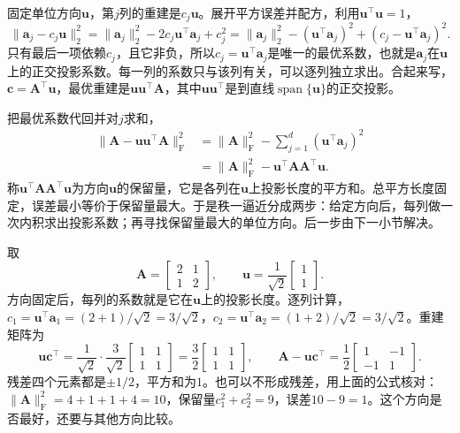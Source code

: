 固定单位方向$\bm u$，第$j$列的重建是$c_j\bm u$。展开平方误差并配方，利用$\bm u^\top\bm u=1$，
\[
 \lVert\bm a_j-c_j\bm u\rVert_2^2
 =\lVert\bm a_j\rVert_2^2-2c_j\bm u^\top\bm a_j+c_j^2
 =\lVert\bm a_j\rVert_2^2-(\bm u^\top\bm a_j)^2+(c_j-\bm u^\top\bm a_j)^2 .
\]
只有最后一项依赖$c_j$，且它非负，所以$c_j=\bm u^\top\bm a_j$是唯一的最优系数，也就是$\bm a_j$在$\bm u$上的正交投影系数。每一列的系数只与该列有关，可以逐列独立求出。合起来写，$\bm c=\bm A^\top\bm u$，最优重建是$\bm u\bm u^\top\bm A$，其中$\bm u\bm u^\top$是到直线$\operatorname{span}\{\bm u\}$的正交投影。

把最优系数代回并对$j$求和，
\[
 \begin{aligned}
 \lVert\bm A-\bm u\bm u^\top\bm A\rVert_{\mathrm F}^2
 &=\lVert\bm A\rVert_{\mathrm F}^2-\sum_{j=1}^d(\bm u^\top\bm a_j)^2\\
 &=\lVert\bm A\rVert_{\mathrm F}^2-\bm u^\top\bm A\bm A^\top\bm u .
 \end{aligned}
\]
称$\bm u^\top\bm A\bm A^\top\bm u$为方向$\bm u$的保留量，它是各列在$\bm u$上投影长度的平方和。总平方长度固定，误差最小等价于保留量最大。于是秩一逼近分成两步：给定方向后，每列做一次内积求出投影系数；再寻找保留量最大的单位方向。后一步由下一小节解决。

\begin{example}[固定方向时的秩一重建]
\label{ex:matrix-approximation-rank-one-fixed-direction}
取
\[
 \bm A=\begin{bmatrix}2&1\\1&2\end{bmatrix},\qquad
 \bm u=\frac1{\sqrt2}\begin{bmatrix}1\\1\end{bmatrix}.
\]
方向固定后，每列的系数就是它在$\bm u$上的投影长度。逐列计算，$c_1=\bm u^\top\bm a_1=(2+1)/\sqrt2=3/\sqrt2$，$c_2=\bm u^\top\bm a_2=(1+2)/\sqrt2=3/\sqrt2$。重建矩阵为
\[
 \bm u\bm c^\top=\frac1{\sqrt2}\cdot\frac3{\sqrt2}\begin{bmatrix}1&1\\1&1\end{bmatrix}
 =\frac32\begin{bmatrix}1&1\\1&1\end{bmatrix},\qquad
 \bm A-\bm u\bm c^\top=\frac12\begin{bmatrix}1&-1\\-1&1\end{bmatrix}.
\]
残差四个元素都是$\pm1/2$，平方和为$1$。也可以不形成残差，用上面的公式核对：$\lVert\bm A\rVert_{\mathrm F}^2=4+1+1+4=10$，保留量$c_1^2+c_2^2=9$，误差$10-9=1$。这个方向是否最好，还要与其他方向比较。
\end{example}

